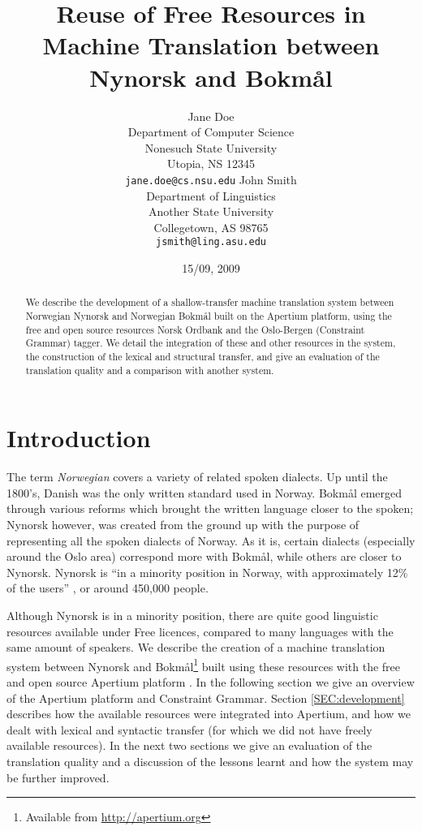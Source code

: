 \documentclass[11pt]{article}
\author{Jane Doe\\  Department of Computer Science \\  Nonesuch State University \\  Utopia, NS 12345 \\  {\tt jane.doe@cs.nsu.edu} \And  John Smith \\  Department of Linguistics \\  Another State University \\  Collegetown, AS 98765 \\    {\tt jsmith@ling.asu.edu}}
\title{Reuse of Free Resources in Machine Translation between Nynorsk and Bokmål}
\date{15/09, 2009}
\begin{document}
\maketitle


  \begin{abstract}
    We describe the development of a shallow-transfer machine translation system between Norwegian Nynorsk and Norwegian Bokmål built on the Apertium platform, using the free and open source resources Norsk Ordbank and the Oslo-Bergen (Constraint Grammar) tagger. We detail the integration of these and other resources in the system, the construction of the lexical and structural transfer, and give an evaluation of the translation quality and a comparison with another system.
  \end{abstract}

\section{Introduction}
\label{sec-1}

The term \emph{Norwegian} covers a variety of related spoken dialects. Up
until the 1800's, Danish was the only written standard used in
Norway. Bokmål emerged through various reforms which brought the
written language closer to the spoken; Nynorsk however, was created
from the ground up with the purpose of representing all the spoken
dialects of Norway. As it is, certain dialects (especially around the
Oslo area) correspond more with Bokmål, while others are closer to
Nynorsk. Nynorsk is ``in a minority position in Norway, with
approximately 12\% of the users'' \citep{everson2000sln}, or around
450,000 people. 

Although Nynorsk is in a minority position, there are quite good
linguistic resources available under Free licences, compared to many
languages with the same amount of speakers.  We describe the creation
of a machine translation system between Nynorsk and Bokmål\footnote{Available from \href{http://apertium.org}{http://apertium.org} } built
using these resources with the free and open source Apertium platform
\citep{corbi05oss}. In the following section we give an overview of
the Apertium platform and Constraint Grammar. Section
\ref{SEC:development} describes how the available resources were
integrated into Apertium, and how we dealt with lexical and syntactic
transfer (for which we did not have freely available resources). In
the next two sections we give an evaluation of the translation quality
and a discussion of the lessons learnt and how the system may be
further improved.
\end{document}
